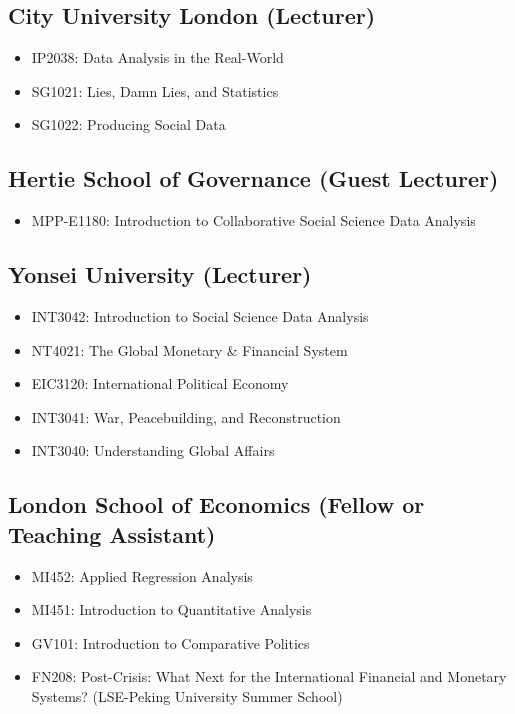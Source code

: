 \documentclass[a4paper]{article}
\begin{document}
\subsection*{City University London (Lecturer)}

\begin{itemize}
    \item IP2038: Data Analysis in the Real-World
    \item SG1021: Lies, Damn Lies, and Statistics
    \item SG1022: Producing Social Data
\end{itemize}

\subsection*{Hertie School of Governance (Guest Lecturer)}

\begin{itemize}

    \item MPP-E1180: Introduction to Collaborative Social Science Data Analysis

\end{itemize}

\subsection*{Yonsei University (Lecturer)}

\begin{itemize}

    \item INT3042: Introduction to Social Science Data Analysis
    \item NT4021: The Global Monetary \& Financial System
    \item EIC3120: International Political Economy
    \item INT3041: War, Peacebuilding, and Reconstruction
    \item INT3040: Understanding Global Affairs

\end{itemize}

\subsection*{London School of Economics (Fellow or Teaching Assistant)}

\begin{itemize}
    \item MI452: Applied Regression Analysis
    \item MI451: Introduction to Quantitative Analysis
    \item GV101: Introduction to Comparative Politics
    \item FN208: Post-Crisis: What Next for the International Financial and Monetary Systems? (LSE-Peking University Summer School)
\end{itemize}
\end{document}
